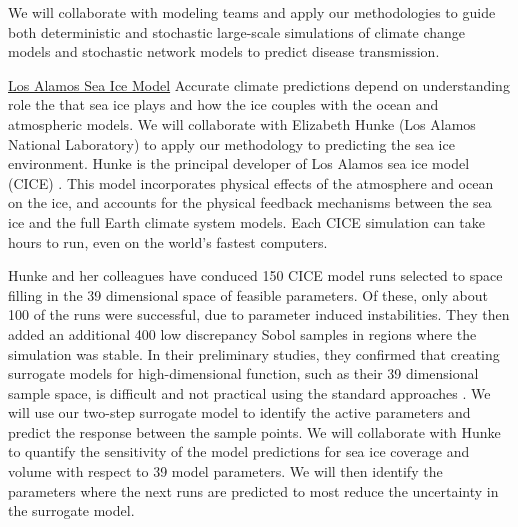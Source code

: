 \documentclass[11pt]{NSFamsart}
\begin{document}
We will collaborate with modeling teams and apply our methodologies to guide both deterministic and stochastic large-scale simulations of climate change models and stochastic network models to predict disease transmission. 


\underline{Los Alamos Sea Ice Model}
Accurate climate predictions depend on understanding role the that sea ice plays and how the ice couples with the ocean and atmospheric models.
We will collaborate with Elizabeth Hunke (Los Alamos National Laboratory) to apply our methodology to predicting the sea ice environment.   Hunke is the principal developer of  Los Alamos sea ice model (CICE) \cite{hunke2017cice, hunke2010cice}. This model incorporates physical effects of the atmosphere and ocean on the ice, and accounts for the physical feedback mechanisms between the sea ice and the full Earth climate system models. Each CICE simulation can take hours to run, even on the world's fastest computers.

   
Hunke and her colleagues have conduced 150 CICE model runs selected to space filling in the 39 dimensional  space of feasible  parameters.   Of these, only about 100 of the runs were successful, due to parameter induced instabilities.  They then added an additional 400 low discrepancy Sobol samples in regions where the simulation was stable.  In their preliminary studies, they confirmed that creating surrogate models for high-dimensional function, such as their 39 dimensional sample space, is difficult and not practical using the standard approaches \cite{bengio2006curse, o2010oxford}.  We will use our two-step surrogate model to identify the active parameters \cite{constantine2014active} and predict the response between the sample points.  
We will collaborate with Hunke to quantify the sensitivity of the model predictions for sea ice coverage and volume with respect to 39 model parameters.  We will then identify the parameters where the next runs are predicted to most reduce the uncertainty in the surrogate model.
    
\end{document}
